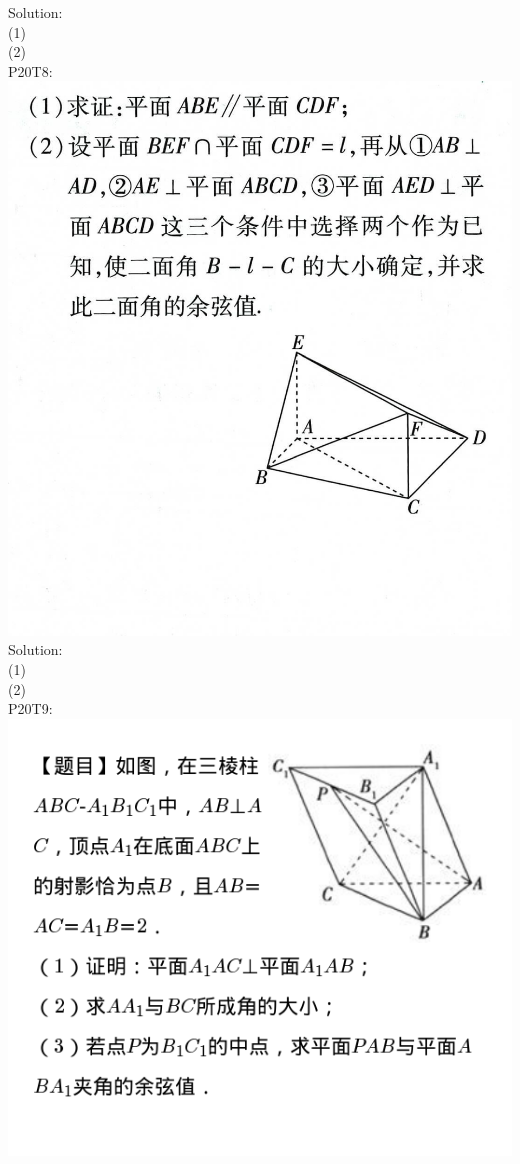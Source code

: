 \documentclass[a4paper,11pt,UTF8]{article}
\begin{document}
Solution:\\
(1)\\
(2)\\
P20T8:\\
\includegraphics[scale=0.5]{./P20T8.jpg}\\
Solution:\\
(1)\\
(2)\\
P20T9:\\
\includegraphics[scale=0.5]{./P20T9.jpg}\\
\end{document}

